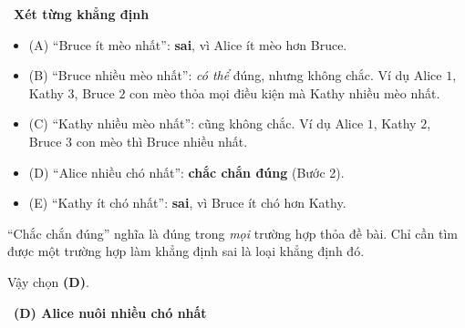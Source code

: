 \documentclass[11pt]{article}
\providecommand{\AnsWord}{Đáp số}
\newcommand{\ans}[1]{\par\smallskip{\bfseries\color{tmGreen!88!black}\AnsWord:}\ {\bfseries\color{AnsRed}#1}\par}
\newcommand{\step}[2]{\par\smallskip\noindent{\bfseries\color{tmBlue!85!black}\StepWord~#1.}\ {\bfseries #2}\par\nopagebreak}
\def\AnsWord{Đáp số}
\def\StepWord{Bước}
\begin{document}
{\step{3}{Xét từng khẳng định}
\begin{itemize}[leftmargin=1.3em,itemsep=1pt]
\item (A) ``Bruce ít mèo nhất'': \textbf{sai}, vì Alice ít mèo hơn Bruce.
\item (B) ``Bruce nhiều mèo nhất'': \emph{có thể} đúng, nhưng không chắc. Ví dụ Alice $1$, Kathy $3$, Bruce $2$ con mèo thỏa mọi điều kiện mà Kathy nhiều mèo nhất.
\item (C) ``Kathy nhiều mèo nhất'': cũng không chắc. Ví dụ Alice $1$, Kathy $2$, Bruce $3$ con mèo thì Bruce nhiều nhất.
\item (D) ``Alice nhiều chó nhất'': \textbf{chắc chắn đúng} (Bước 2).
\item (E) ``Kathy ít chó nhất'': \textbf{sai}, vì Bruce ít chó hơn Kathy.
\end{itemize}
\begin{warnbox}``Chắc chắn đúng'' nghĩa là đúng trong \emph{mọi} trường hợp thỏa đề bài. Chỉ cần tìm được một trường hợp làm khẳng định sai là loại khẳng định đó.\end{warnbox}
Vậy chọn \textbf{(D)}.
\ans{(D) Alice nuôi nhiều chó nhất}
}
\end{document}
